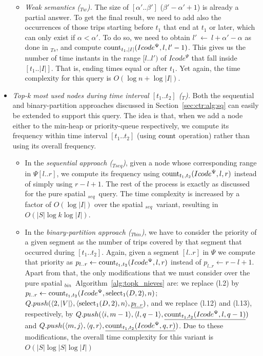 \begin{itemize}
\begin{itemize}
			
			\item {\em Weak semantics (\XtoY$_{Tw}$).}
			The size of $[\alpha'..\beta']$ ($\beta' - \alpha' + 1$) is already a partial answer. To get the final result, we need to add 
			also the occurrences of those trips starting before $t_1$ that end at $t_1$ or later, which can only exist if $\alpha<\alpha'$. 
			To do so, we need to obtain $l'~\leftarrow~l+\alpha'-\alpha$ as done in \XtoY$_{Ts}$, and compute $\operatorname{count}_{t_1, |I|}(Icode^{\Psi},l,l'-1)$. This gives us the number of time instants in the range $[l..l')$ of  $Icode^{\Psi}$ that fall inside $[t_1..|I|]$. 
			That is, ending times equal or after $t_1$. Yet again, the time complexity for this query is $O(\log n + \log|I|)$.
		\end{itemize}
		
		


	\item {\em Top-k most used nodes during  time interval $[t_1..t_2]$ (\topK$_T$).}
	Both the sequential and binary-partition approaches discussed in Section~\ref{sec:ctr:alg:sq} can easily
	be extended to support this query. The idea is that, when we add a node either to the min-heap or priority-queue
	respectively, we compute its frequency within time interval $[t_1..t_2]$ (using $\operatorname{count}$ operation) 
	rather than using its overall frequency.

	\begin{itemize}
		\item In the {\em sequential approach (\topK$_{Tseq}$)}, given a node whose corresponding range
		in $\Psi[l..r]$, we compute its frequency using $\operatorname{count}_{t_1,t_2}(Icode^{\Psi},l,r)$ instead of simply using  $r-l+1$. 
		The rest of the process is exactly as discussed for the pure spatial \topK$_{seq}$\ query. The time complexity is increased by a factor of $O(\log|I|)$ over the spatial \topK$_{seq}$\ variant, resulting in $O(|S|\log k\log|I|)$.
		
		\item In the {\em binary-partition approach (\topK$_{Tbin}$)}, we have to consider the priority of a
		given segment as the number of trips covered by that segment that occurred during $[t_1..t_2]$. Again, given
		a segment $[l..r]$ in $\Psi$ we compute that priority as $p_{l..r} \leftarrow \operatorname{count}_{t_1,t_2}(Icode^{\Psi},l,r)$ instead of 
		$p_{l..r} \leftarrow  r-l+1$. Apart from
		that, the only modifications that we must consider over the pure spatial \topK$_{bin}$\ Algorithm~\ref{alg:topk_nieves} are:
		we replace (l.2) by $p_{l..r} \leftarrow \operatorname{count}_{t_1,t_2}(Icode^{\Psi},\operatorname{select}_1(D,2),n)$; $Q.push(\langle2, |V|\rangle, \langle \operatorname{select}_1(D,2), n\rangle, \underline{p_{l..r}})$,
		and we replace  (l.12) and (l.13), respectively, by 
		   $ Q.push(\langle i, m-1 \rangle, \langle l, q-1 \rangle, \underline{\operatorname{count}_{t_1,t_2}(Icode^{\Psi},l,q-1)})$ and
		   $ Q.push(\langle m,   j \rangle, \langle q,   r \rangle, \underline{\operatorname{count}_{t_1,t_2}(Icode^{\Psi},q,r)})$. Due to these modifications, the overall time complexity for this variant is $O(|S|\log|S|\log|I|)$
		

\end{itemize}
\end{itemize}
